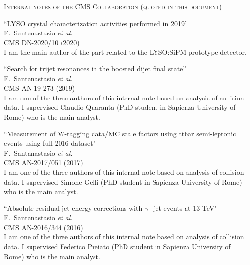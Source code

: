 \documentclass[10pt, a4paper]{article}
\begin{document}
\begin{thebibliography}{599}
\vspace{0.1cm} \begin{center} \textsc{Internal notes of the CMS
    Collaboration (quoted in this document)} \end{center} \vspace{0.05cm}

``LYSO crystal characterization activities performed in 2019''
  \\{}F.~Santanastasio {\it et al.}
  \\{}CMS DN-2020/10 (2020)
  \\ I am the main author of the part related to the LYSO:SiPM prototype detector.

``Search for trijet resonances in the boosted dijet final state''
  \\{}F.~Santanastasio {\it et al.}
  \\{}CMS AN-19-273 (2019)
  \\ I am one of the three authors of this internal note based on
  analysis of collision data. I supervised
  Claudio Quaranta (PhD student in Sapienza University of Rome) who is
  the main analyst.

``Measurement of W-tagging data/MC scale factors using ttbar semi-leptonic events using full 2016 dataset"
  \\{}F.~Santanastasio {\it et al.}
  \\{}CMS AN-2017/051 (2017)
  \\ I am one of the three authors of this internal note based on
  analysis of collision data. I supervised
  Simone Gelli (PhD student in Sapienza University of Rome) who is
  the main analyst.

``Absolute residual jet energy corrections with $\gamma$+jet events at 13 TeV"
  \\{}F.~Santanastasio {\it et al.}
  \\{}CMS AN-2016/344 (2016)
  \\ I am one of the three authors of this internal note based on
  analysis of collision data. I supervised
  Federico Preiato (PhD student in Sapienza University of Rome) who is
  the main analyst.


\end{thebibliography}
\end{document}
